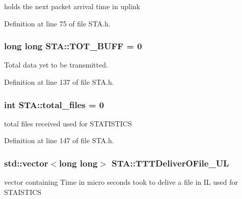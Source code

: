 holds the next packet arrival time in uplink 



Definition at line 75 of file S\-T\-A.\-h.

\hypertarget{classSTA_aea9dd38428aa0d91147434e67ade8dad}{
\subsubsection[{T\-O\-T\-\_\-\-B\-U\-F\-F}]{\setlength{\rightskip}{0pt plus 5cm}long long S\-T\-A\-::\-T\-O\-T\-\_\-\-B\-U\-F\-F = 0}}\label{classSTA_aea9dd38428aa0d91147434e67ade8dad}


Total data yet to be transmitted. 



Definition at line 137 of file S\-T\-A.\-h.

\hypertarget{classSTA_a16afe91328cf843a216a5a67808eaecb}{
\subsubsection[{total\-\_\-files}]{\setlength{\rightskip}{0pt plus 5cm}int S\-T\-A\-::total\-\_\-files = 0}}\label{classSTA_a16afe91328cf843a216a5a67808eaecb}


total files received used for S\-T\-A\-T\-I\-S\-T\-I\-C\-S 



Definition at line 147 of file S\-T\-A.\-h.

\hypertarget{classSTA_a74581a3136b0942d2addb54b75da49ff}{
\subsubsection[{T\-T\-T\-Deliver\-O\-File\-\_\-\-U\-L}]{\setlength{\rightskip}{0pt plus 5cm}std\-::vector$<$long long$>$ S\-T\-A\-::\-T\-T\-T\-Deliver\-O\-File\-\_\-\-U\-L}}\label{classSTA_a74581a3136b0942d2addb54b75da49ff}


vector containing Time in micro seconds took to delive a file in I\-L used for S\-T\-A\-I\-S\-T\-I\-C\-S 



